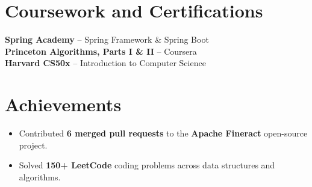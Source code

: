 \documentclass[letterpaper,11pt]{article}
\newcommand{\resumeItem}[1]{\item\small{{#1 \vspace{-2pt}}}}
\newcommand{\resumeItemListEnd}{\end{itemize}\vspace{-2pt}}
\newcommand{\resumeAchievementListStart}{
\begin{itemize}[
leftmargin=0.2in,
label=\textbullet,
itemsep=-1pt,
topsep=0pt
]
}
\begin{document}
\section{Coursework and Certifications}
\small
\textbf{Spring Academy} -- Spring Framework \& Spring Boot \\[1pt]
\textbf{Princeton Algorithms, Parts I \& II} -- Coursera \\[1pt]
\textbf{Harvard CS50x} -- Introduction to Computer Science
\normalsize


\section{Achievements}

\resumeAchievementListStart
\resumeItem{Contributed \textbf{6 merged pull requests} to the \textbf{Apache Fineract} open-source project.}
\resumeItem{Solved \textbf{150+ LeetCode} coding problems across data structures and algorithms.}
\resumeItemListEnd
\end{document}
